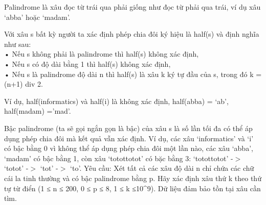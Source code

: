 Palindrome là xâu đọc từ trái qua phải giống như đọc từ phải qua trái, ví dụ xâu ‘abba’ hoặc ‘madam’.  

   Với xâu s bất kỳ người ta xác định phép chia đôi ký hiệu là half(s) và định nghĩa như sau:   
\\   • Nếu s không phải là palindrome thì half(s) không xác định,   
\\   • Nếu s có độ dài bằng 1 thì half(s) không xác định,   
\\   • Nếu s là palindrome độ dài n thì half(s) là xâu k ký tự đầu của s, trong đó k = (n+1) div 2.  

   Ví dụ, half(informatics) và half(i) là không xác định, half(abba) = ‘ab’, half(madam) =’mad’.  

   Bậc palindrome (ta sẽ gọi ngắn gọn là bậc) của xâu s là số lần tối đa có thể áp dụng phép chia đôi mà kết quả vẫn xác định. Ví dụ, các xâu ‘informatics’ và ‘i’ có bậc bằng 0 vì không thể áp dụng phép chia đôi một lần nào, các xâu ‘abba’, ‘madam’ có bậc bằng 1, còn xâu ‘totottotot’ có bặc bằng 3: ‘totottotot’ -$>$ ‘totot’ -$>$ ‘tot’ -$>$ ‘to’.       Yêu cầu:      Xét tất cả các xâu độ dài n chỉ chứa các chữ cái la tinh thường và có bậc palindrome bằng p. Hãy xác định xâu thứ k theo thứ tự từ điển (1 ≤ n ≤ 200, 0 ≤ p ≤ 8, 1 ≤ k ≤10^9). Dữ liệu đảm bảo tồn tại xâu cần tìm.